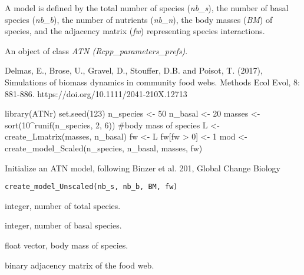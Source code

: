 \documentclass[letterpaper]{book}
\begin{document}
%
\begin{Details}\relax
A model is defined by the total number of species
(\emph{nb\_s}), the number of basal species (\emph{nb\_b}),
the number of nutrients (\emph{nb\_n}), the body masses
(\emph{BM}) of species, and the adjacency matrix (\emph{fw})
representing species interactions.
\end{Details}
%
\begin{Value}
An object of class \emph{ATN (Rcpp\_parameters\_prefs)}.
\end{Value}
%
\begin{References}\relax


Delmas, E., Brose, U., Gravel, D., Stouffer, D.B. and Poisot, T.
(2017), Simulations of biomass dynamics in community food webs. Methods
Ecol Evol, 8: 881-886. https://doi.org/10.1111/2041-210X.12713
\end{References}
%
\begin{Examples}
\begin{ExampleCode}
library(ATNr)
set.seed(123)
n_species <- 50
n_basal <- 20
masses <- sort(10^runif(n_species, 2, 6)) #body mass of species
L <- create_Lmatrix(masses, n_basal)
fw <- L
fw[fw > 0] <- 1
mod <- create_model_Scaled(n_species, n_basal, masses, fw)
\end{ExampleCode}
\end{Examples}
%
\begin{Description}\relax
Initialize an ATN model, following Binzer et al. 201, Global Change Biology
\end{Description}
%
\begin{Usage}
\begin{verbatim}
create_model_Unscaled(nb_s, nb_b, BM, fw)
\end{verbatim}
\end{Usage}
%
\begin{Arguments}
\begin{ldescription}
\item[\code{nb\_s}] integer, number of total species.

\item[\code{nb\_b}] integer, number of basal species.

\item[\code{BM}] float vector, body mass of species.

\item[\code{fw}] binary adjacency matrix of the food web.
\end{ldescription}
\end{Arguments}
\end{document}
